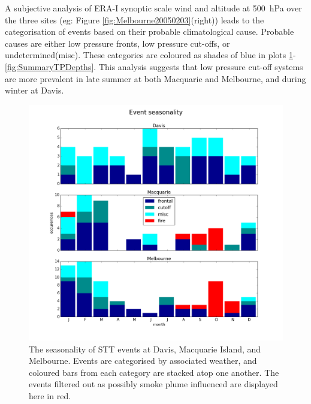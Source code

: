 \documentclass{article}
\begin{document}
  A subjective analysis of ERA-I synoptic scale wind and altitude at 500~hPa over the three sites (eg: Figure \ref{fig:Melbourne20050203}(right)) leads to the categorisation of events based on their probable climatological cause.
  Probable causes are either low pressure fronts, low pressure cut-offs, or undetermined(misc).
  These categories are coloured as shades of blue in plots \ref{fig:SummarySeasonality}-\ref{fig:SummaryTPDepths}.
  This analysis suggests that low pressure cut-off systems are more prevalent in late summer at both Macquarie and Melbourne, and during winter at Davis.

  \begin{figure}[!htbp]
    \begin{center}
    \includegraphics[width=1.0\columnwidth]{figures/summary_season.png}
    \caption{The seasonality of STT events at Davis, Macquarie Island, and Melbourne.
    Events are categorised by associated weather, and coloured bars from each category are stacked atop one another.
    The events filtered out as possibly smoke plume influenced are displayed here in red.}
    \label{fig:SummarySeasonality}
    \end{center}
  \end{figure}
  
\end{document}
